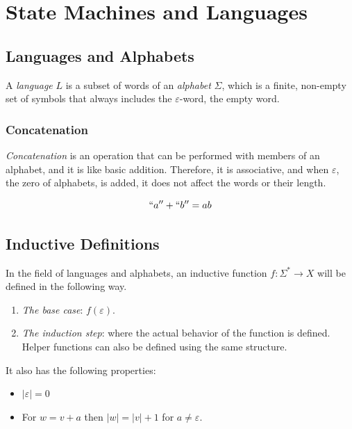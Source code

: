 \chapter{State Machines and Languages}

\section{Languages and Alphabets}

A \emph{language} \(L\) is a subset of words of an \emph{alphabet} \(\Sigma\), which is a finite, 
non-empty set of symbols that always includes the \(\varepsilon\)-word, the empty word.

\subsection{Concatenation}

\emph{Concatenation} is an operation that can be performed with members of an alphabet, and it is like 
basic addition. Therefore, it is associative, and when \(\varepsilon\), the zero of alphabets, is added, it does not affect the words 
or their length.

\[
    ``a'' + ``b'' = ab
\]

\section{Inductive Definitions}

In the field of languages and alphabets, an inductive function \(f: \Sigma^* \to X\) will be defined 
in the following way.

\begin{enumerate}

    \item \emph{The base case}: \(f(\varepsilon)\).
    
    \item \emph{The induction step}: where the actual behavior of the function is defined. Helper 
          functions can also be defined using the same structure.

\end{enumerate}

It also has the following properties:

\begin{itemize}
    
    \item \(|\varepsilon| = 0\)
    
    \item For \(w = v + a\) then \(|w| = |v| + 1\) for \(a \ne \varepsilon\).

\end{itemize}

